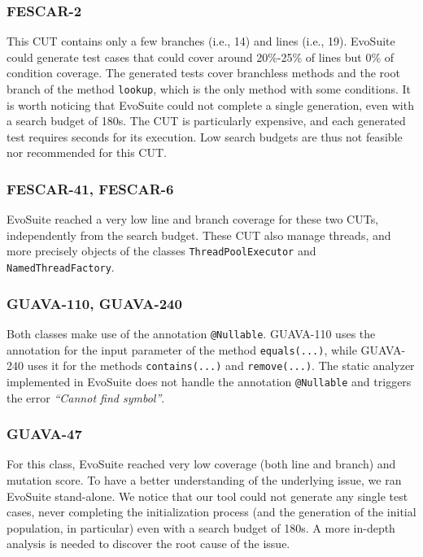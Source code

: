 \documentclass[sigconf]{acmart}
\newcommand{\EVOSUITE}{{\sc EvoSuite}\xspace}
\begin{document}

\subsubsection*{FESCAR-2} This CUT contains only a few branches (i.e., 14) and lines (i.e., 19). \EVOSUITE could generate test cases that could cover around 20\%-25\% of lines but 0\% of condition coverage. The generated tests cover branchless methods and the root branch of the method \texttt{lookup}, which is the only method with some conditions. It is worth noticing that \EVOSUITE could not complete a single generation, even with a search budget of 180s. The CUT is particularly expensive, and each generated test requires seconds for its execution. Low search budgets are thus not feasible nor recommended for this CUT.

\subsubsection*{FESCAR-41, FESCAR-6} \EVOSUITE reached a very low line and branch coverage for these two CUTs, independently from the search budget. These CUT also manage threads, and more precisely objects of the classes \texttt{ThreadPoolExecutor} and \texttt{NamedThreadFactory}.



\subsubsection*{GUAVA-110, GUAVA-240} Both classes make use of the annotation \texttt{@Nullable}. GUAVA-110 uses the annotation for the input parameter of the method \texttt{equals(...)}, while GUAVA-240 uses it for the methods \texttt{contains(...)} and \texttt{remove(...)}. The static analyzer implemented in \EVOSUITE does not handle the annotation \texttt{@Nullable} and triggers the error \textit{``Cannot find symbol''}. 

\subsubsection*{GUAVA-47} For this class, \EVOSUITE reached very low coverage (both line and branch) and mutation score. To have a better understanding of the underlying issue, we ran \EVOSUITE stand-alone. We notice that our tool could not generate any single test cases, never completing the initialization process (and the generation of the initial population, in particular) even with a search budget of 180s. A more in-depth analysis is needed to discover the root cause of the issue.  
\end{document}
